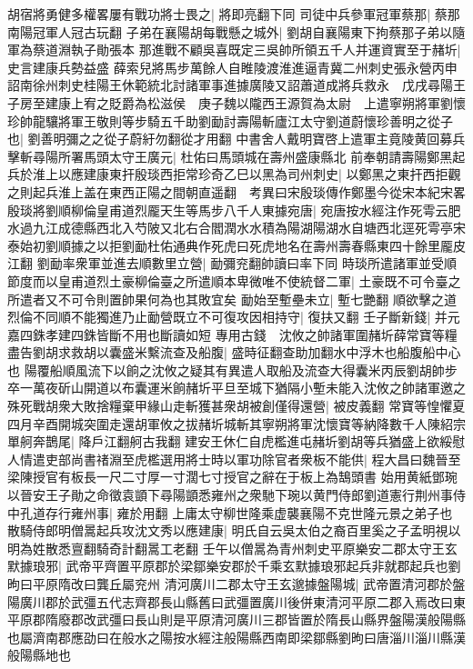 胡宿將勇健多權畧屢有戰功將士畏之|{
	將即亮翻下同}
司徒中兵參軍冠軍蔡那|{
	蔡那南陽冠軍人冠古玩翻}
子弟在襄陽胡每戰懸之城外|{
	劉胡自襄陽東下拘蔡那子弟以隨軍為蔡道淵執子勛張本}
那進戰不顧吳喜既定三吳帥所領五千人并運資實至于赭圻|{
	史言建康兵勢益盛}
薛索兒將馬步萬餘人自睢陵渡淮進逼青冀二州刺史張永營丙申詔南徐州刺史桂陽王休範統北討諸軍事進據廣陵又詔蕭道成將兵救永　戊戌尋陽王子房至建康上宥之貶爵為松滋侯　庚子魏以隴西王源賀為太尉　上遣寧朔將軍劉懷珍帥龍驤將軍王敬則等步騎五千助劉勔討壽陽斬廬江太守劉道蔚懷珍善明之從子也|{
	劉善明彌之之從子蔚紆勿翻從才用翻}
中書舍人戴明寶啓上遣軍主竟陵黄回募兵擊斬尋陽所署馬頭太守王廣元|{
	杜佑曰馬頭城在壽州盛康縣北}
前奉朝請壽陽鄭黑起兵於淮上以應建康東扞殷琰西拒常珍奇乙巳以黑為司州刺史|{
	以鄭黑之東扞西拒觀之則起兵淮上盖在東西正陽之間朝直遥翻　考異曰宋殷琰傳作鄭墨今從宋本紀宋畧}
殷琰將劉順柳倫皇甫道烈龎天生等馬步八千人東據宛唐|{
	宛唐按水經注作死雩云肥水過九江成德縣西北入芍陂又北右合閻潤水水積為陽湖陽湖水自塘西北逕死雩亭宋泰始初劉順據之以拒劉勔杜佑通典作死虎曰死虎地名在壽州壽春縣東四十餘里龎皮江翻}
劉勔率衆軍並進去順數里立營|{
	勔彌兖翻帥讀曰率下同}
時琰所遣諸軍並受順節度而以皇甫道烈土豪柳倫臺之所遣順本卑微唯不使統督二軍|{
	土豪既不可令臺之所遣者又不可令則置帥果何為也其敗宜矣}
勔始至塹壘未立|{
	塹七艷翻}
順欲擊之道烈倫不同順不能獨進乃止勔營既立不可復攻因相持守|{
	復扶又翻}
壬子斷新錢|{
	并元嘉四銖孝建四銖皆斷不用也斷讀如短}
專用古錢　沈攸之帥諸軍圍赭圻薛常寶等糧盡告劉胡求救胡以囊盛米繫流查及船腹|{
	盛時征翻查助加翻水中浮木也船腹船中心也}
陽覆船順風流下以餉之沈攸之疑其有異遣人取船及流查大得囊米丙辰劉胡帥步卒一萬夜斫山開道以布囊運米餉赭圻平旦至城下猶隔小塹未能入沈攸之帥諸軍邀之殊死戰胡衆大敗捨糧棄甲緣山走斬獲甚衆胡被創僅得還營|{
	被皮義翻}
常寶等惶懼夏四月辛酉開城突圍走還胡軍攸之拔赭圻城斬其寧朔將軍沈懷寶等納降數千人陳紹宗單舸奔鵲尾|{
	降戶江翻舸古我翻}
建安王休仁自虎檻進屯赭圻劉胡等兵猶盛上欲綏慰人情遣吏部尚書禇淵至虎檻選用將士時以軍功除官者衆板不能供|{
	程大昌曰魏晉至梁陳授官有板長一尺二寸厚一寸濶七寸授官之辭在于板上為鵠頭書}
始用黄紙鄧琬以晉安王子勛之命徵袁顗下尋陽顗悉雍州之衆馳下琬以黄門侍郎劉道憲行荆州事侍中孔道存行雍州事|{
	雍於用翻}
上庸太守柳世隆乘虚襲襄陽不克世隆元景之弟子也　散騎侍郎明僧暠起兵攻沈文秀以應建康|{
	明氏自云吳太伯之裔百里奚之子孟明視以明為姓散悉亶翻騎奇計翻暠工老翻}
壬午以僧暠為青州刺史平原樂安二郡太守王玄默據琅邪|{
	武帝平齊置平原郡於梁鄒樂安郡於千乘玄默據琅邪起兵非就郡起兵也劉昫曰平原隋改曰龔丘屬兖州}
清河廣川二郡太守王玄邈據盤陽城|{
	武帝置清河郡於盤陽廣川郡於武彊五代志齊郡長山縣舊曰武彊置廣川後併東清河平原二郡入焉改曰東平原郡隋廢郡改武彊曰長山則是平原清河廣川三郡皆置於隋長山縣界盤陽漢般陽縣也屬濟南郡應劭曰在般水之陽按水經注般陽縣西南即梁鄒縣劉昫曰唐淄川淄川縣漢般陽縣地也}

